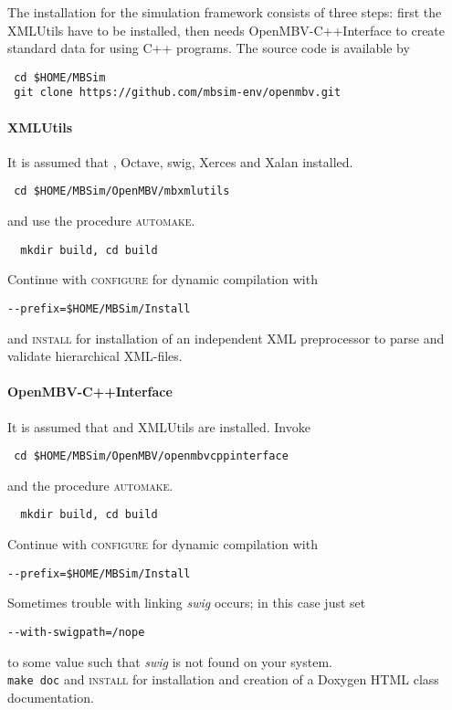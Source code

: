 \subsubsection{\OpenMBV{}}
The installation for the simulation framework consists of three steps: first the XMLUtils have to be installed, then \MBSim{} needs \textsf{OpenMBV-C++Interface} to create standard data for \OpenMBV{} using C++ programs. The source code is available by
\begin{verbatim}
 cd $HOME/MBSim
 git clone https://github.com/mbsim-env/openmbv.git
\end{verbatim}
%
\paragraph{XMLUtils}
It is assumed that \FMatVec{}, Octave, swig, Xerces and Xalan installed.
\begin{verbatim}
 cd $HOME/MBSim/OpenMBV/mbxmlutils
\end{verbatim} 
and use the procedure \textsc{automake}.
\begin{verbatim}
  mkdir build, cd build
\end{verbatim}
Continue with \textsc{configure} for dynamic compilation with
\begin{verbatim}
--prefix=$HOME/MBSim/Install
\end{verbatim}
and \textsc{install} for installation of an independent XML preprocessor to parse and validate hierarchical XML-files.

\paragraph{OpenMBV-C++Interface}
It is assumed that \HDFSerie{} and XMLUtils are installed. Invoke
\begin{verbatim}
 cd $HOME/MBSim/OpenMBV/openmbvcppinterface
\end{verbatim} 
and the procedure \textsc{automake}.
\begin{verbatim}
  mkdir build, cd build
\end{verbatim}
Continue with \textsc{configure} for dynamic compilation with
\begin{verbatim}
--prefix=$HOME/MBSim/Install
\end{verbatim}
Sometimes trouble with linking \emph{swig} occurs; in this case just set
\begin{verbatim}
--with-swigpath=/nope
\end{verbatim}
to some value such that \emph{swig} is not found on your system.\\
%
\texttt{make doc} and \textsc{install} for installation and creation of a Doxygen HTML class documentation. 
%
